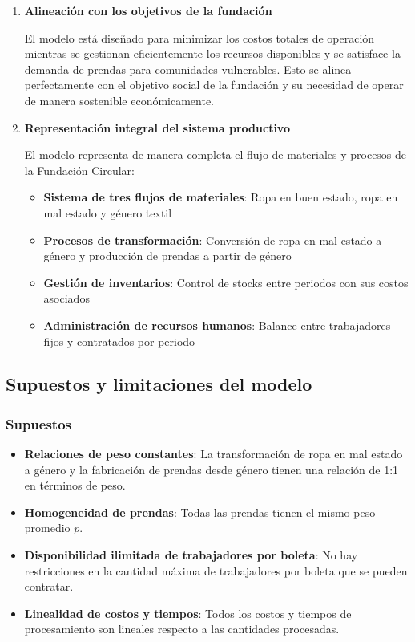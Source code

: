 \begin{enumerate}
    \item \textbf{Alineación con los objetivos de la fundación}
    
    El modelo está diseñado para minimizar los costos totales de operación mientras se gestionan eficientemente los recursos disponibles y se satisface la demanda de prendas para comunidades vulnerables. Esto se alinea perfectamente con el objetivo social de la fundación y su necesidad de operar de manera sostenible económicamente.

    \item \textbf{Representación integral del sistema productivo}
    
    El modelo representa de manera completa el flujo de materiales y procesos de la Fundación Circular:
    \begin{itemize}
        \item \textbf{Sistema de tres flujos de materiales}: Ropa en buen estado, ropa en mal estado y género textil
        \item \textbf{Procesos de transformación}: Conversión de ropa en mal estado a género y producción de prendas a partir de género
        \item \textbf{Gestión de inventarios}: Control de stocks entre periodos con sus costos asociados
        \item \textbf{Administración de recursos humanos}: Balance entre trabajadores fijos y contratados por periodo
    \end{itemize}
\end{enumerate}

\subsection*{Supuestos y limitaciones del modelo}

\subsubsection*{Supuestos}
\begin{itemize}
    \item \textbf{Relaciones de peso constantes}: La transformación de ropa en mal estado a género y la fabricación de prendas desde género tienen una relación de 1:1 en términos de peso.
    \item \textbf{Homogeneidad de prendas}: Todas las prendas tienen el mismo peso promedio $p$.
    \item \textbf{Disponibilidad ilimitada de trabajadores por boleta}: No hay restricciones en la cantidad máxima de trabajadores por boleta que se pueden contratar.
    \item \textbf{Linealidad de costos y tiempos}: Todos los costos y tiempos de procesamiento son lineales respecto a las cantidades procesadas.
\end{itemize}


